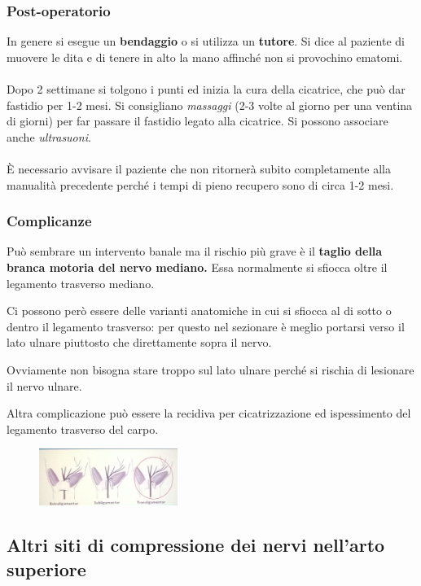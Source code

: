 \subsubsection{Post-operatorio}

In genere si esegue un \textbf{bendaggio} o si utilizza un
\textbf{tutore}.
Si dice al paziente di muovere le dita e di tenere in alto la mano affinché non si provochino ematomi.
\\\\
Dopo 2 settimane si tolgono i punti ed inizia la cura della cicatrice, che può dar fastidio per 1-2 mesi. Si consigliano \emph{massaggi} (2-3 volte al giorno per una ventina di giorni) per far passare il fastidio legato alla cicatrice.
Si possono associare anche \emph{ultrasuoni}.
\\\\
È necessario avvisare il paziente che non ritornerà subito completamente alla manualità precedente perché i tempi di pieno recupero sono di circa 1-2 mesi.

\subsubsection{Complicanze}

Può sembrare un intervento banale ma il rischio più grave è il \textbf{taglio della branca motoria del nervo mediano.} Essa normalmente si sfiocca oltre il legamento trasverso mediano.

Ci possono però essere delle varianti anatomiche in cui si sfiocca al di sotto o dentro il legamento trasverso: per questo nel sezionare è meglio portarsi verso il lato ulnare piuttosto che direttamente sopra il nervo.

Ovviamente non bisogna stare troppo sul lato ulnare perché si rischia di lesionare il nervo ulnare.

Altra complicazione può essere la recidiva per cicatrizzazione ed ispessimento del legamento trasverso del carpo.

\begin{figure}[!ht]
\centering
\includegraphics[width=0.4\textwidth]{006/image3.jpeg}
\end{figure}

\subsection{Altri siti di compressione dei nervi nell'arto superiore }


